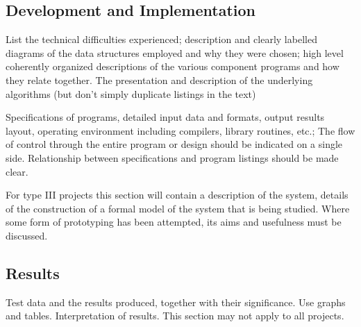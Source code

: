 \documentclass[12]{article}
\begin{document}
\subsection{Development and Implementation}
\begin{list}{}{}
\item List the technical difficulties experienced; description and clearly labelled diagrams of the data 
structures employed and why they were chosen; high level coherently organized descriptions of the 
various component programs and how they relate together. The presentation and description of the 
underlying algorithms (but don’t simply duplicate listings in the text) 
\item Specifications of programs, detailed input  data and formats, output results layout, operating 
environment including compilers, library routines, etc.; The flow of control through the entire program 
or design should be indicated on a single side. Relationship between specifications and program listings 
should be made clear. 
\item For type III projects this section will contain a description of the system, details of the construction 
of a formal model of the system that is being studied. Where some form of prototyping has been 
attempted, its aims and usefulness must be discussed.  
\end{list}
\subsection{Results}
\begin{list}{}{}
\item Test data and the results produced, together with their significance. Use graphs and tables. 
Interpretation of results. This section may not apply to all projects.  
\end{list}
\end{document}
